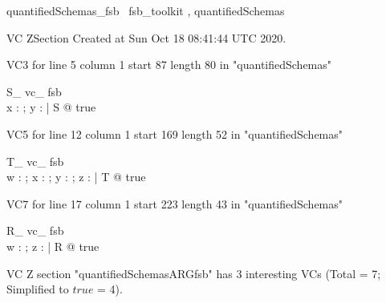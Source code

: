 \documentclass{article}
\begin{document}

\begin{zsection}	 \SECTION quantifiedSchemas\_fsb \parents~fsb\_toolkit , quantifiedSchemas
\end{zsection}

VC ZSection Created at Sun Oct 18 08:41:44 UTC 2020.

VC3 for line 5 column 1 start 87 length 80 in "quantifiedSchemas"
\begin{theorem}{ S\_ vc\_ fsb}\\
 \exists x : \nat ; y : \power \nat | S @ true \\

\end{theorem}

VC5 for line 12 column 1 start 169 length 52 in "quantifiedSchemas"
\begin{theorem}{ T\_ vc\_ fsb}\\
 \exists w : \nat ; x : \nat ; y : \power \nat ; z : \nat | T @ true \\

\end{theorem}

VC7 for line 17 column 1 start 223 length 43 in "quantifiedSchemas"
\begin{theorem}{ R\_ vc\_ fsb}\\
 \exists w : \nat ; z : \nat | R @ true \\

\end{theorem}



 VC Z section "quantifiedSchemasARGfsb" has $3$ interesting VCs (Total = 7; Simplified to $true$ = 4).



\end{document}
